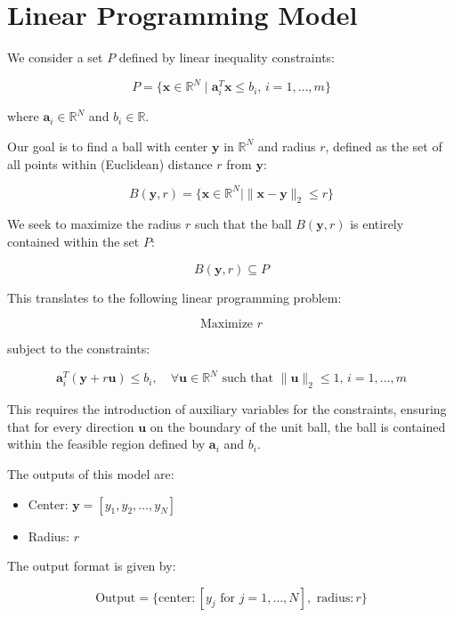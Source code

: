 \documentclass{article}
\begin{document}
\section*{Linear Programming Model}

We consider a set \( P \) defined by linear inequality constraints:

\[
P = \{ \mathbf{x} \in \mathbb{R}^N \mid \mathbf{a}_i^T \mathbf{x} \leq b_i, \, i = 1, \ldots, m \}
\]

where \( \mathbf{a}_i \in \mathbb{R}^N \) and \( b_i \in \mathbb{R} \).

Our goal is to find a ball with center \( \mathbf{y} \) in \( \mathbb{R}^N \) and radius \( r \), defined as the set of all points within (Euclidean) distance \( r \) from \( \mathbf{y} \):

\[
B(\mathbf{y}, r) = \{ \mathbf{x} \in \mathbb{R}^N \mid \| \mathbf{x} - \mathbf{y} \|_2 \leq r \}
\]

We seek to maximize the radius \( r \) such that the ball \( B(\mathbf{y}, r) \) is entirely contained within the set \( P \):

\[
B(\mathbf{y}, r) \subseteq P
\]

This translates to the following linear programming problem:

\[
\text{Maximize } r
\]

subject to the constraints:

\[
\mathbf{a}_i^T (\mathbf{y} + r \mathbf{u}) \leq b_i, \quad \forall \mathbf{u} \in \mathbb{R}^N \text{ such that } \| \mathbf{u} \|_2 \leq 1, \, i = 1, \ldots, m
\]

This requires the introduction of auxiliary variables for the constraints, ensuring that for every direction \( \mathbf{u} \) on the boundary of the unit ball, the ball is contained within the feasible region defined by \( \mathbf{a}_i \) and \( b_i \).

The outputs of this model are:

\begin{itemize}
    \item Center: \( \mathbf{y} = [y_1, y_2, \ldots, y_N] \)
    \item Radius: \( r \)
\end{itemize}

The output format is given by:

\[
\text{Output} = \{ \text{center}: [y_j \text{ for } j = 1, \ldots, N], \text{ radius}: r \}
\]
\end{document}
